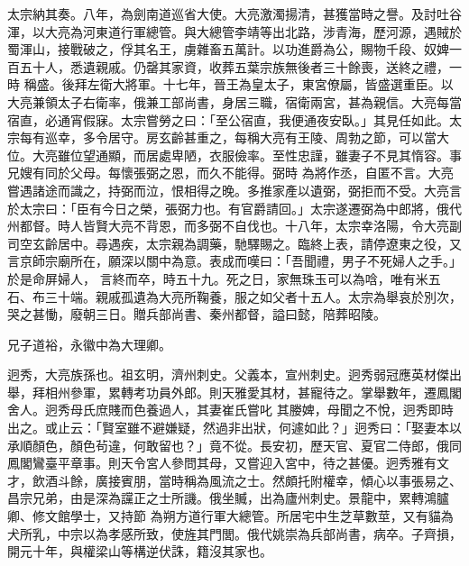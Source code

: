 \begin{pinyinscope}
 太宗納其奏。八年，為劍南道巡省大使。大亮激濁揚清，甚獲當時之譽。及討吐谷渾，以大亮為河東道行軍總管。與大總管李靖等出北路，涉青海，歷河源，遇賊於蜀渾山，接戰破之，俘其名王，虜雜畜五萬計。以功進爵為公，賜物千段、奴婢一百五十人，悉遺親戚。仍罄其家資，收葬五葉宗族無後者三十餘喪，送終之禮，一時
 稱盛。後拜左衛大將軍。十七年，晉王為皇太子，東宮僚屬，皆盛選重臣。以大亮兼領太子右衛率，俄兼工部尚書，身居三職，宿衛兩宮，甚為親信。大亮每當宿直，必通宵假寐。太宗嘗勞之曰：「至公宿直，我便通夜安臥。」其見任如此。太宗每有巡幸，多令居守。房玄齡甚重之，每稱大亮有王陵、周勃之節，可以當大位。大亮雖位望通顯，而居處卑陋，衣服儉率。至性忠謹，雖妻子不見其惰容。事兄嫂有同於父母。每懷張弼之恩，而久不能得。弼時
 為將作丞，自匿不言。大亮嘗遇諸途而識之，持弼而泣，恨相得之晚。多推家產以遺弼，弼拒而不受。大亮言於太宗曰：「臣有今日之榮，張弼力也。有官爵請回。」太宗遂遷弼為中郎將，俄代州都督。時人皆賢大亮不背恩，而多弼不自伐也。十八年，太宗幸洛陽，令大亮副司空玄齡居中。尋遇疾，太宗親為調藥，馳驛賜之。臨終上表，請停遼東之役，又言京師宗廟所在，願深以關中為意。表成而嘆曰：「吾聞禮，男子不死婦人之手。」於是命屏婦人，
 言終而卒，時五十九。死之日，家無珠玉可以為唅，唯有米五石、布三十端。親戚孤遺為大亮所鞠養，服之如父者十五人。太宗為舉哀於別次，哭之甚慟，廢朝三日。贈兵部尚書、秦州都督，謚曰懿，陪葬昭陵。



 兄子道裕，永徽中為大理卿。



 迥秀，大亮族孫也。祖玄明，濟州刺史。父義本，宣州刺史。迥秀弱冠應英材傑出舉，拜相州參軍，累轉考功員外郎。則天雅愛其材，甚寵待之。掌舉數年，遷鳳閣舍人。迥秀母氏庶賤而色養過人，其妻崔氏嘗叱
 其媵婢，母聞之不悅，迥秀即時出之。或止云：「賢室雖不避嫌疑，然過非出狀，何遽如此？」迥秀曰：「娶妻本以承順顏色，顏色茍違，何敢留也？」竟不從。長安初，歷天官、夏官二侍郎，俄同鳳閣鸞臺平章事。則天令宮人參問其母，又嘗迎入宮中，待之甚優。迥秀雅有文才，飲酒斗餘，廣接賓朋，當時稱為風流之士。然頗托附權幸，傾心以事張易之、昌宗兄弟，由是深為讜正之士所譏。俄坐贓，出為廬州刺史。景龍中，累轉鴻臚卿、修文館學士，又持節
 為朔方道行軍大總管。所居宅中生芝草數莖，又有貓為犬所乳，中宗以為孝感所致，使旌其門閭。俄代姚崇為兵部尚書，病卒。子齊損，開元十年，與權梁山等構逆伏誅，籍沒其家也。




\end{pinyinscope}
